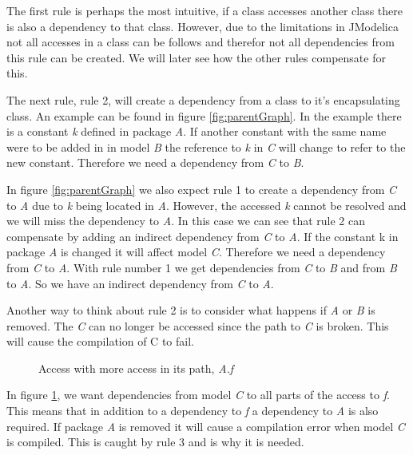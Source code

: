 \documentclass{cslthse-msc}
\begin{document}
The first rule is perhaps the most intuitive, if a class accesses another class there is also a dependency to that class. However, due to the limitations in JModelica not all accesses in a class can be follows and therefor not all dependencies from this rule can be created. We will later see how the other rules compensate for this. 

The next rule, rule 2, will create a dependency from a class to it's encapsulating class. An example can be found in figure \ref{fig:parentGraph}. In the example there is a constant \textit{k} defined in package \textit{A}. If another constant with the same name were to be added in in model \textit{B} the reference to \textit{k} in \textit{C} will change to refer to the new constant. Therefore we need a dependency from \textit{C} to \textit{B}.

In figure \ref{fig:parentGraph} we also expect rule 1 to create a dependency from \textit{C} to \textit{A} due to \textit{k} being located in \textit{A}. However, the accessed \textit{k} cannot be resolved and we will miss the dependency to \textit{A}. In this case we can see that rule 2 can compensate by adding an indirect dependency from \textit{C} to \textit{A}. 
If the constant k in package \textit{A} is changed it will affect model \textit{C}. Therefore we need a dependency from \textit{C} to \textit{A}. With rule number 1 we get dependencies from \textit{C} to \textit{B} and from \textit{B} to \textit{A}. So we have an indirect dependency from \textit{C} to \textit{A}.

Another way to think about rule 2 is to consider what happens if \textit{A} or \textit{B} is removed. The \textit{C} can no longer be accessed since the path to \textit{C} is broken. This will cause the compilation of C to fail.

\begin{figure}[!htbp]
    \centering
    \qquad
    \caption{Access with more access in its path, \textit{A.f}}
    \label{fig:dotAccess}
\end{figure}

In figure \ref{fig:dotAccess}, we want dependencies from model \textit{C} to all parts of the access to \textit{f}. This means that in addition to a dependency to \textit{f} a dependency to \textit{A} is also required. If package \textit{A} is removed it will cause a compilation error when model \textit{C} is compiled. This is caught by rule 3 and is why it is needed.
\end{document}
